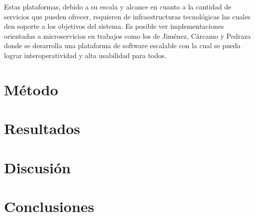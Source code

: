 \documentclass[12pt]{article}
\begin{document}
    Estas plataformas, debido a su escala y alcance en cuanto a la cantidad de servicios que pueden ofrecer, requieren de 
    infraestructuras tecnológicas las cuales den soporte a los objetivos del sistema. Es posible ver implementaciones orientadas a microservicios en trabajos como los de Jiménez, Cárcamo y Pedraza \citeyear{henry_2020} donde se desarrolla una plataforma de software escalable con la cual se pueda lograr interoperatividad y alta usabilidad para todos.

    \pagebreak

    \section{Método}

    \section{Resultados}

    \section{Discusión}

    \section{Conclusiones}

    \newpage
    
    
\end{document}
